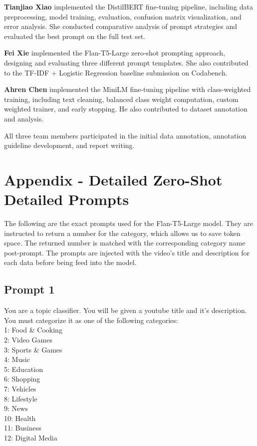 \documentclass[11pt]{article}
\begin{document}
\textbf{Tianjiao Xiao} implemented the DistilBERT fine-tuning pipeline, including data preprocessing, model training, evaluation, confusion matrix visualization, and error analysis. She conducted comparative analysis of prompt strategies and evaluated the best prompt on the full test set.

\textbf{Fei Xie} implemented the Flan-T5-Large zero-shot prompting approach, designing and evaluating three different prompt templates. She also contributed to the TF-IDF + Logistic Regression baseline submission on Codabench.

\textbf{Ahren Chen} implemented the MiniLM fine-tuning pipeline with class-weighted training, including text cleaning, balanced class weight computation, custom weighted trainer, and early stopping. He also contributed to dataset annotation and analysis.

All three team members participated in the initial data annotation, annotation guideline development, and report writing.

\section*{Appendix - Detailed Zero-Shot Detailed Prompts}
  The following are the exact prompts used for the Flan-T5-Large model. They are instructed to return a number for the category, which allows us to save token space.
  The returned number is matched with the corresponding category name post-prompt. The prompts are injected with the video's title and description for each data before being feed into the model.
  \subsection{Prompt 1}\label{prompt-one}
    You are a topic classifier. You will be given a youtube title and it's description. You must categorize it as one of the following categories: 
    \\1: Food \& Cooking
    \\2: Video Games
    \\3: Sports \& Games
    \\4: Music
    \\5: Education
    \\6: Shopping
    \\7: Vehicles
    \\8: Lifestyle
    \\9: News
    \\10: Health
    \\11: Business
    \\12: Digital Media
    
\end{document}

